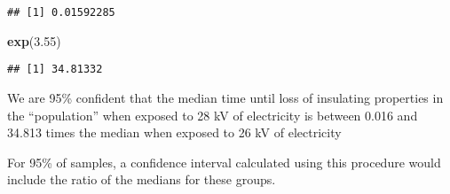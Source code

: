 \documentclass[]{article}
\newenvironment{Shaded}{\begin{snugshade}}{\end{snugshade}}
\newcommand{\FloatTok}[1]{\textcolor[rgb]{0.00,0.00,0.81}{#1}}
\newcommand{\KeywordTok}[1]{\textcolor[rgb]{0.13,0.29,0.53}{\textbf{#1}}}
\newcommand{\NormalTok}[1]{#1}
\begin{document}
\begin{verbatim}
## [1] 0.01592285
\end{verbatim}

\begin{Shaded}
\begin{Highlighting}[]
\KeywordTok{exp}\NormalTok{(}\FloatTok{3.55}\NormalTok{)}
\end{Highlighting}
\end{Shaded}

\begin{verbatim}
## [1] 34.81332
\end{verbatim}

We are 95\% confident that the median time until loss of insulating
properties in the ``population'' when exposed to 28 kV of electricity is
between 0.016 and 34.813 times the median when exposed to 26 kV of
electricity

For 95\% of samples, a confidence interval calculated using this
procedure would include the ratio of the medians for these groups.
\end{document}
